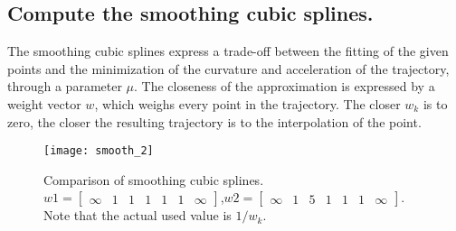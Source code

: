 \newpage

\subsection{Compute the smoothing cubic splines.}

The smoothing cubic splines express a trade-off between the fitting of the given points and the minimization of the curvature and acceleration of the trajectory, through a parameter $\mu$. The closeness of the approximation is expressed by a weight vector $w$, which weighs every point in the trajectory. The closer $w_k$ is to zero, the closer the resulting trajectory is to the interpolation of the point.

\begin{figure}[h]
\centering
\texttt{[image: smooth\_2]}
\caption{Comparison of smoothing cubic splines. $w1=\begin{bmatrix}
\infty &1 &1 &1 &1 &1 &\infty
\end{bmatrix}$,$w2=\begin{bmatrix}
\infty &1 &5 &1 &1 &1 &\infty
\end{bmatrix}$. Note that the actual used value is $1/w_k$.}
\end{figure}
